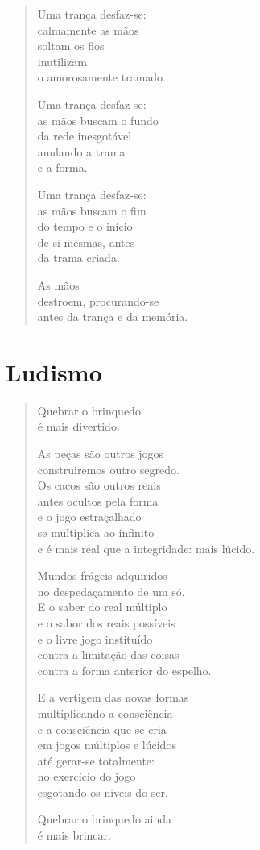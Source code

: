 \begin{verse}
Uma trança desfaz-se:\\
calmamente as mãos\\
soltam os fios\\
inutilizam\\
o amorosamente tramado.

Uma trança desfaz-se:\\
as mãos buscam o fundo\\
da rede inesgotável\\
anulando a trama\\
e a forma.

Uma trança desfaz-se:\\
as mãos buscam o fim\\
do tempo e o início\\
de si mesmas, antes\\
da trama criada.

As mãos\\
destroem, procurando-se\\
antes da trança e da memória.
\end{verse}

\chapter{Ludismo}

\begin{verse}
Quebrar o brinquedo\\
é mais divertido.

As peças são outros jogos\\
construiremos outro segredo.\\
Os cacos são outros reais\\
antes ocultos pela forma\\
e o jogo estraçalhado\\
se multiplica ao infinito\\
e é mais real que a integridade: mais lúcido.

Mundos frágeis adquiridos\\
no despedaçamento de um só.\\
E o saber do real múltiplo\\
e o sabor dos reais possíveis\\
e o livre jogo instituído\\
contra a limitação das coisas\\
contra a forma anterior do espelho.

E a vertigem das novas formas\\
multiplicando a consciência\\
e a consciência que se cria\\
em jogos múltiplos e lúcidos\\
até gerar-se totalmente:\\
no exercício do jogo\\
esgotando os níveis do ser.

Quebrar o brinquedo ainda\\
é mais brincar.
\end{verse}

